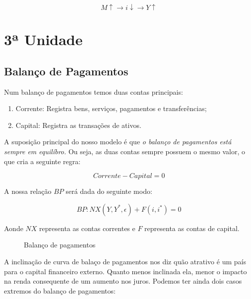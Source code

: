 \documentclass[12pt,a4paper,oneside,brazil]{abntex2}
\begin{document}
\[ M \uparrow \rightarrow i \downarrow \rightarrow Y \uparrow\]

\chapter{3ª Unidade}
\section{Balanço de Pagamentos}
Num balanço de pagamentos temos duas contas principais: 

\begin{enumerate}
    \item Corrente: Registra bens, serviços, pagamentos e transferências; 
    \item Capital: Registra as transações de ativos.
\end{enumerate}

A suposição principal do nosso modelo é que \emph{o balanço de pagamentos está sempre em equilíbro.} Ou seja, as duas contas sempre possuem o mesmo valor, o que cria a seguinte regra:

\begin{equation} \label{contas}
    Corrente - Capital = 0
\end{equation}

A nossa relação $BP$ será dada do seguinte modo:

\begin{equation} \label{BP}
    BP: NX (Y, Y^*, \epsilon) + F (i, i^*) = 0    
\end{equation}

Aonde $NX$ representa as contas correntes e $F$ representa as contas de capital.

\begin{figure}[ht]
    \centering
    \caption{Balanço de pagamentos}
    \label{fig:BP}
\end{figure}

A inclinação de curva de balaço de pagamentos nos diz quão atrativo é um país para o capital financeiro externo. Quanto menos inclinada ela, menor o impacto na renda consequente de um aumento nos juros. Podemos ter ainda dois casos extremos do balanço de pagamentos:
\end{document}
